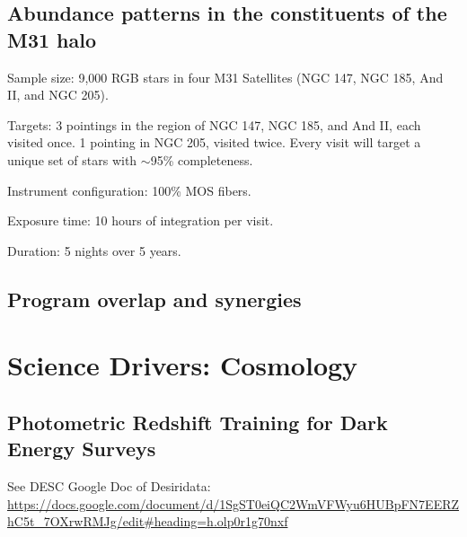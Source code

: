 \documentclass[11pt,a4paper,twoside,onecolumn,openany,final,oldfontcommands]{memoir}
\begin{document}
\section{Abundance patterns in the constituents of the M31 halo}

\begin{programrequirement}

\reqitem Sample size: 9,000 RGB stars in four M31 Satellites (NGC 147, NGC 185, And II, and NGC 205).

\reqitem Targets: 3 pointings in the region of NGC 147, NGC 185, and And II, each visited once. 1 pointing in NGC 205, visited twice. Every visit will target a unique set of stars with $\sim$95\% completeness.

\reqitem Instrument configuration: 100\% MOS fibers.

\reqitem Exposure time: 10 hours of integration per visit.

\reqitem Duration: 5 nights over 5 years.

\end{programrequirement}

\section{Program overlap and synergies}



\chapter{Science Drivers: Cosmology} \label{sci:cosmology}

\section{Photometric Redshift Training for Dark Energy Surveys}
\label{sci:photoz}

See DESC Google Doc of Desiridata: \url{https://docs.google.com/document/d/1SgST0eiQC2WmVFWyu6HUBpFN7EERZhC5t\_7OXrwRMJg/edit\#heading=h.olp0r1g70nxf}
\end{document}
